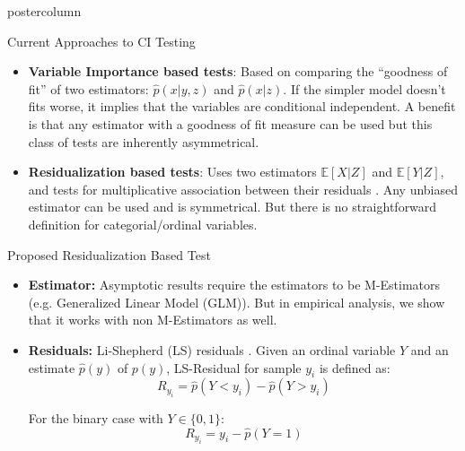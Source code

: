 \documentclass{beamer}
\begin{document}
\begin{frame}
\begin{columns}
\begin{column}{.33\textwidth}
\begin{beamercolorbox}[center]{postercolumn}
\begin{minipage}{.98\textwidth}
{\begin{myblock}{Current Approaches to CI Testing}
\begin{itemize}
							\item \textbf{Variable Importance based tests}: Based on comparing the ``goodness of
								fit'' of two estimators: $ \hat{p}(x | y, z) $ and $ \hat{p}(x|z) $.
								If the simpler model doesn't fits worse, it implies that the variables 
								are conditional independent. A benefit is that any estimator with a 
								goodness of fit measure can be used but this class of tests are inherently asymmetrical.
							\item \textbf{Residualization based tests}: Uses two estimators $
								\mathbb{E}[X | Z] $ and $ \mathbb{E}[Y|Z] $, and tests
								for multiplicative association between their residuals \cite{Daudin1980}. Any unbiased
								estimator can be used and is symmetrical. But there is no straightforward definition for
								categorial/ordinal variables.
						\end{itemize}
					\end{myblock}\vfill
					\begin{myblock}{Proposed Residualization Based Test}
						\begin{itemize}
							\item \textbf{Estimator:} Asymptotic results require the
								estimators to be M-Estimators (e.g. Generalized Linear
								Model (GLM)). But in empirical analysis, we show that it works with non M-Estimators as well.
							\item \textbf{Residuals:} Li-Shepherd (LS) residuals \cite{li2012}.
								Given an ordinal variable $ Y $ and an estimate $ \hat{p}(y) $ of $
								p(y) $, LS-Residual for sample $ y_i $ is defined as:
								$$ R_{y_i} = \hat{p}(Y < y_i) - \hat{p}(Y > y_i) $$

								For the binary case with $ Y \in \{0, 1\} $:
								$$ R_{y_i} = y_i - \hat{p}(Y = 1) $$


\end{itemize}
\end{myblock}}
\end{minipage}
\end{beamercolorbox}
\end{column}
\end{columns}
\end{frame}
\end{document}
